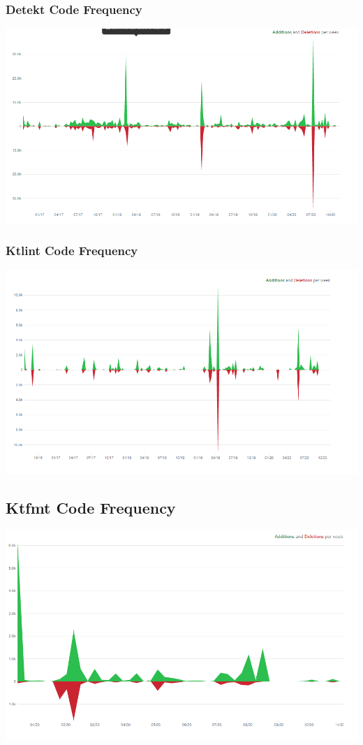 \subsubsection{Detekt Code Frequency}
\includegraphics[scale=0.6]{pictures/detekt.png}
\subsubsection{Ktlint Code Frequency}
\includegraphics[scale=0.6]{pictures/ktlint.png}
\subsection{Ktfmt Code Frequency}
\includegraphics[scale=0.6]{pictures/ktfmt.png}
